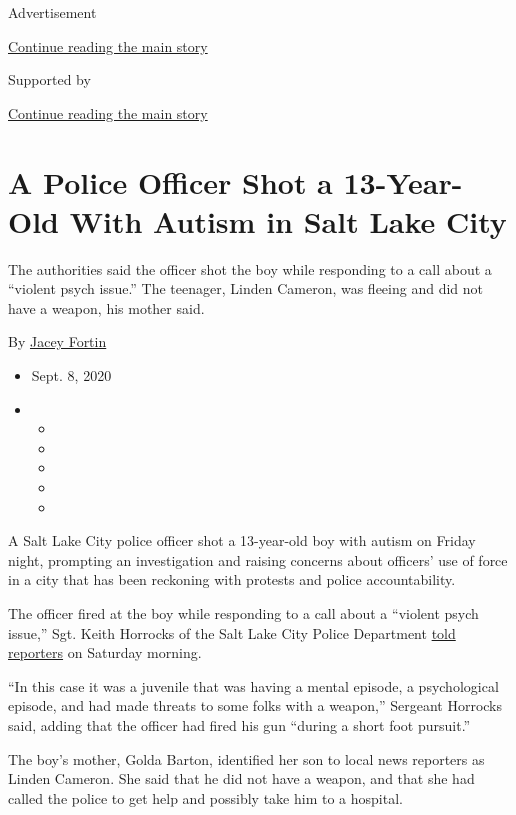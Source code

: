 Advertisement

\protect\hyperlink{after-top}{Continue reading the main story}

Supported by

\protect\hyperlink{after-sponsor}{Continue reading the main story}

\hypertarget{a-police-officer-shot-a-13-year-old-with-autism-in-salt-lake-city}{%
\section{A Police Officer Shot a 13-Year-Old With Autism in Salt Lake
City}\label{a-police-officer-shot-a-13-year-old-with-autism-in-salt-lake-city}}

The authorities said the officer shot the boy while responding to a call
about a ``violent psych issue.'' The teenager, Linden Cameron, was
fleeing and did not have a weapon, his mother said.

By \href{https://www.nytimes3xbfgragh.onion/by/jacey-fortin}{Jacey
Fortin}

\begin{itemize}
\item
  Sept. 8, 2020
\item
  \begin{itemize}
  \item
  \item
  \item
  \item
  \item
  \end{itemize}
\end{itemize}

A Salt Lake City police officer shot a 13-year-old boy with autism on
Friday night, prompting an investigation and raising concerns about
officers' use of force in a city that has been reckoning with protests
and police accountability.

The officer fired at the boy while responding to a call about a
``violent psych issue,'' Sgt. Keith Horrocks of the Salt Lake City
Police Department
\href{https://kutv.com/news/local/developing-news-shooting-in-salt-lake-city}{told
reporters} on Saturday morning.

``In this case it was a juvenile that was having a mental episode, a
psychological episode, and had made threats to some folks with a
weapon,'' Sergeant Horrocks said, adding that the officer had fired his
gun ``during a short foot pursuit.''

The boy's mother, Golda Barton, identified her son to local news
reporters as Linden Cameron. She said that he did not have a weapon, and
that she had called the police to get help and possibly take him to a
hospital.

